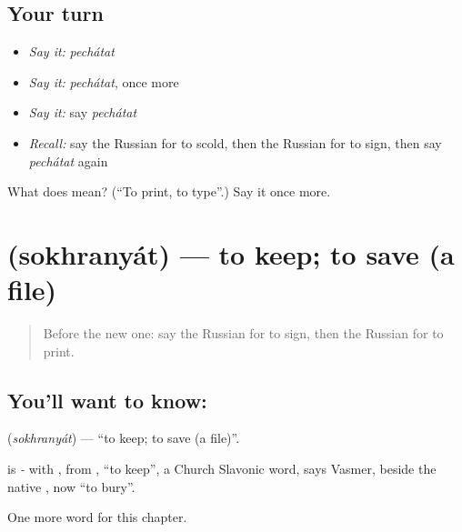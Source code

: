 \subsection*{Your turn}
\begin{itemize}
\raggedright
  \item \emph{Say it:} \emph{pechátat}
  \item \emph{Say it:} \emph{pechátat}, once more
  \item \emph{Say it:} say \emph{pechátat}
  \item \emph{Recall:} say the Russian for to scold, then the Russian for to sign, then say \emph{pechátat} again
\end{itemize}

\begin{tcolorbox}[breakable,colback=teal!4,colframe=teal!35!black,title={Before you move on}]
What does  mean? (\textquotedblleft{}To print, to type\textquotedblright{}.) Say it once more.
\end{tcolorbox}
\section[\texorpdfstring{\ru{сохранять} (sokhranyát)}{сохранять (sokhranyát)}]{ (sokhranyát) — to keep; to save (a file)}

\label{lesson:RU-C145-sokhranyat}



\begin{quote}
Before the new one: say the Russian for to sign, then the Russian for to print.
\end{quote}

\subsection*{You'll want to know: }
\textbf{} (\emph{sokhranyát}) — \textquotedblleft{}to keep; to save (a file)\textquotedblright{}.

\begin{cousinweb}
\textbf{} is \emph{-} with \emph{}, from \emph{}, \textquotedblleft{}to keep\textquotedblright{}, a Church Slavonic word, says Vasmer, beside the native \emph{}, now \textquotedblleft{}to bury\textquotedblright{}.
\end{cousinweb}

\begin{grammarlens}[title={What you've built}]
One more word for this chapter.
\end{grammarlens}

